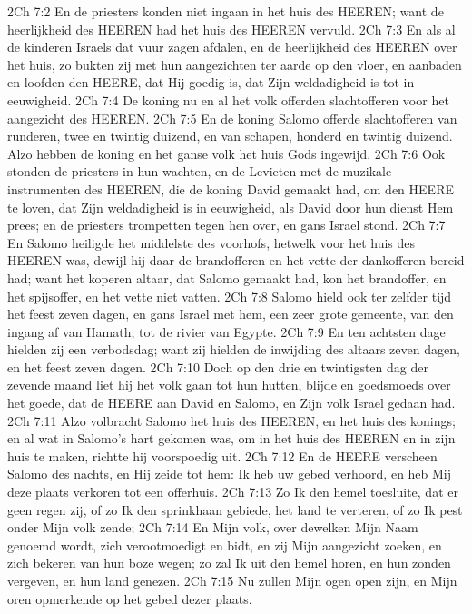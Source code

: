 2Ch 7:2  En de priesters konden niet ingaan in het huis des HEEREN; want de heerlijkheid des HEEREN had het huis des HEEREN vervuld.
2Ch 7:3  En als al de kinderen Israels dat vuur zagen afdalen, en de heerlijkheid des HEEREN over het huis, zo bukten zij met hun aangezichten ter aarde op den vloer, en aanbaden en loofden den HEERE, dat Hij goedig is, dat Zijn weldadigheid is tot in eeuwigheid.
2Ch 7:4  De koning nu en al het volk offerden slachtofferen voor het aangezicht des HEEREN.
2Ch 7:5  En de koning Salomo offerde slachtofferen van runderen, twee en twintig duizend, en van schapen, honderd en twintig duizend. Alzo hebben de koning en het ganse volk het huis Gods ingewijd.
2Ch 7:6  Ook stonden de priesters in hun wachten, en de Levieten met de muzikale instrumenten des HEEREN, die de koning David gemaakt had, om den HEERE te loven, dat Zijn weldadigheid is in eeuwigheid, als David door hun dienst Hem prees; en de priesters trompetten tegen hen over, en gans Israel stond.
2Ch 7:7  En Salomo heiligde het middelste des voorhofs, hetwelk voor het huis des HEEREN was, dewijl hij daar de brandofferen en het vette der dankofferen bereid had; want het koperen altaar, dat Salomo gemaakt had, kon het brandoffer, en het spijsoffer, en het vette niet vatten.
2Ch 7:8  Salomo hield ook ter zelfder tijd het feest zeven dagen, en gans Israel met hem, een zeer grote gemeente, van den ingang af van Hamath, tot de rivier van Egypte.
2Ch 7:9  En ten achtsten dage hielden zij een verbodsdag; want zij hielden de inwijding des altaars zeven dagen, en het feest zeven dagen.
2Ch 7:10  Doch op den drie en twintigsten dag der zevende maand liet hij het volk gaan tot hun hutten, blijde en goedsmoeds over het goede, dat de HEERE aan David en Salomo, en Zijn volk Israel gedaan had.
2Ch 7:11  Alzo volbracht Salomo het huis des HEEREN, en het huis des konings; en al wat in Salomo's hart gekomen was, om in het huis des HEEREN en in zijn huis te maken, richtte hij voorspoedig uit.
2Ch 7:12  En de HEERE verscheen Salomo des nachts, en Hij zeide tot hem: Ik heb uw gebed verhoord, en heb Mij deze plaats verkoren tot een offerhuis.
2Ch 7:13  Zo Ik den hemel toesluite, dat er geen regen zij, of zo Ik den sprinkhaan gebiede, het land te verteren, of zo Ik pest onder Mijn volk zende;
2Ch 7:14  En Mijn volk, over dewelken Mijn Naam genoemd wordt, zich verootmoedigt en bidt, en zij Mijn aangezicht zoeken, en zich bekeren van hun boze wegen; zo zal Ik uit den hemel horen, en hun zonden vergeven, en hun land genezen.
2Ch 7:15  Nu zullen Mijn ogen open zijn, en Mijn oren opmerkende op het gebed dezer plaats.
